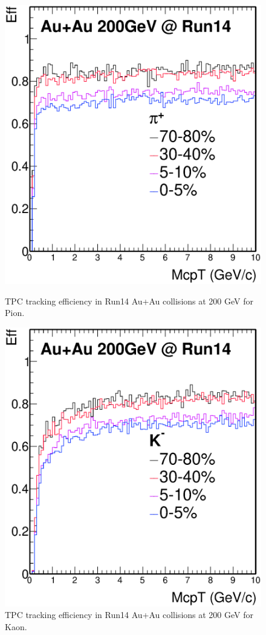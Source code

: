 \documentclass[a4paper]{article}
\begin{document}
\begin{figure}[htbp]
\begin{minipage}[htbp]{0.52\linewidth}
\centering
\includegraphics[width=1.0\textwidth]{fig/pion.eps}
\caption{TPC tracking efficiency in Run14 Au+Au collisions at 200 GeV for Pion. \label{fig:mpion}}
\end{minipage}
\hfill
\begin{minipage}[htbp]{0.52\linewidth}
\centering
\includegraphics[width=1.0\textwidth]{fig/kaon.eps} 
\caption{TPC tracking efficiency in Run14 Au+Au collisions at 200 GeV for Kaon. \label{fig:mkaon}}
\end{minipage}
\end{figure}
\end{document}
